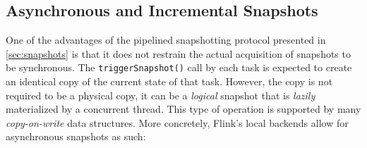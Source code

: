 

\subsection{Asynchronous and Incremental Snapshots}
\label{sec:async}
One of the advantages of the pipelined snapshotting protocol presented in \autoref{sec:snapshots} is that it does not restrain the actual acquisition of snapshots to be synchronous. The \texttt{triggerSnapshot()} call by each task is expected to create an identical copy of the current state of that task. However, the copy is not required to be a physical copy, it can be a \emph{logical} snapshot that is \emph{lazily} materialized by a concurrent thread. This type of operation is supported by many \emph{copy-on-write} data structures. More concretely, Flink's local backends allow for asynchronous snapshots as such:

